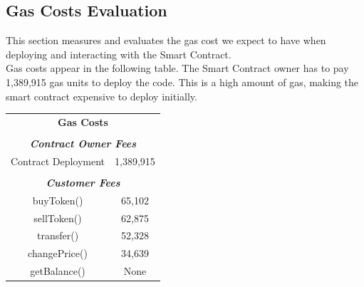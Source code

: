 \documentclass[12pt,a4paper]{article}
\begin{document}
\subsection*{Gas Costs Evaluation}
This section measures and evaluates the gas cost we expect to have when deploying and
interacting with the Smart Contract. \\

Gas costs appear in the following table. The Smart Contract owner has to pay
1,389,915 gas units to deploy the code. This is a high amount of gas, making the
smart contract expensive to deploy initially. \\

\begin{table}[htpb]
    \begin{center}
        \begin{tabular}{cc}
        \multicolumn{2}{c}{\textbf{Gas Costs}}                                                                \\
        \multicolumn{1}{l}{}                                                & \multicolumn{1}{l}{}            \\ \hline
        \multicolumn{2}{|c|}{\textit{\textbf{Contract Owner Fees}}}                                           \\ \hline
        \multicolumn{1}{|c|}{Contract Deployment}                           & \multicolumn{1}{c|}{1,389,915}  \\ \hline
        \multicolumn{1}{l}{}                                                & \multicolumn{1}{l}{}            \\ \hline
        \multicolumn{2}{|c|}{\textit{\textbf{Customer Fees}}}                                                 \\ \hline
        \multicolumn{1}{|c|}{buyToken()}                                   & \multicolumn{1}{c|}{65,102}   \\ \hline
        \multicolumn{1}{|c|}{sellToken()}                                  & \multicolumn{1}{c|}{62,875}   \\ \hline
        \multicolumn{1}{|c|}{transfer()}                                   & \multicolumn{1}{c|}{52,328}   \\ \hline
        \multicolumn{1}{|c|}{changePrice()}                                & \multicolumn{1}{c|}{34,639}   \\ \hline
        \multicolumn{1}{|c|}{getBalance()}                                 & \multicolumn{1}{c|}{None}   \\ \hline

\end{tabular}
\end{center}
\end{table}
\end{document}
